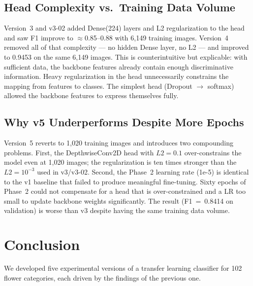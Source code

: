 \documentclass[conference]{IEEEtran}
\begin{document}
\subsection{Head Complexity vs.\ Training Data Volume}
Version~3 and v3-02 added Dense(224) layers and L2 regularization to
the head and saw F1 improve to $\approx$0.85--0.88 with 6,149 training
images. Version~4 removed all of that complexity — no hidden Dense
layer, no L2 — and improved to 0.9453 on the same 6,149 images.
This is counterintuitive but explicable: with sufficient data, the
backbone features already contain enough discriminative information.
Heavy regularization in the head unnecessarily constrains the mapping
from features to classes. The simplest head (Dropout $\to$ softmax)
allowed the backbone features to express themselves fully.

\subsection{Why v5 Underperforms Despite More Epochs}
Version~5 reverts to 1,020 training images and introduces two
compounding problems. First, the DepthwiseConv2D head with
$L2 = 0.1$ over-constrains the model even at 1,020 images; the
regularization is ten times stronger than the $L2 = 10^{-3}$ used
in v3/v3-02. Second, the Phase~2 learning rate (1e-5) is identical
to the v1 baseline that failed to produce meaningful fine-tuning.
Sixty epochs of Phase~2 could not compensate for a head that is
over-constrained and a LR too small to update backbone weights
significantly. The result (F1~=~0.8414 on validation) is worse than
v3 despite having the same training data volume.

\section{Conclusion}

We developed five experimental versions of a transfer learning
classifier for 102 flower categories, each driven by the findings of
the previous one.
\end{document}
